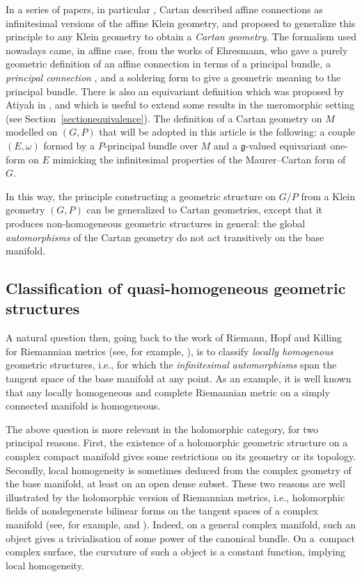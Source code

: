 \documentclass[10pt,a4paper]{amsart}
\numberwithin{equation}{section}
\begin{document}
In a series of papers, in particular \cite{Cartan2}, Cartan described affine connections as infinitesimal versions of the affine Klein geometry, and proposed to generalize this principle to any Klein geometry to obtain a \textit{Cartan geometry}. The formalism used nowadays came, in affine case, from the works of Ehresmann, who gave a purely geometric definition of an affine connection in terms of a principal bundle, a \textit{principal connection} \cite[p.~154]{Erhesmanh}, and a soldering form to give a geometric meaning to the principal bundle. There is also an equivariant definition which was proposed by Atiyah in \cite[p.~188]{Atiyah}, and which is useful to extend some results in the meromorphic setting (see Section~\ref{sectionequivalence}). The definition of a Cartan geometry on $M$ modelled on $(G,P)$ that will be adopted in this article is the following: a couple $(E,\omega)$ formed by a $P$-principal bundle over $M$ and a $\mathfrak{g}$-valued equivariant one-form on $E$ mimicking the infinitesimal properties of the Maurer--Cartan form of $G$.

 In this way, the principle constructing a geometric structure on $G/P$ from a Klein geometry $(G,P)$ can be generalized to Cartan geometries, except that it produces non-homogeneous geometric structures in general: the global \textit{automorphisms} of the Cartan geometry do not act transitively on the base manifold.

 \subsection{Classification of quasi-homogeneous geometric structures}
 A natural question then, going back to the work of Riemann, Hopf and Killing for Riemannian metrics (see, for example, \cite{Wolf}), is to classify \textit{locally homogenous} geometric structures, i.e., for which the \textit{infinitesimal automorphisms} span the tangent space of the base manifold at any point. As an example, it is well known that any locally homogeneous and complete Riemannian metric on a simply connected manifold is homogeneous.

 The above question is more relevant in the holomorphic category, for two principal reasons. First, the existence of a holomorphic geometric structure on a complex compact manifold gives some restrictions on its geometry or its topology. Secondly, local homogeneity is sometimes deduced from the complex geometry of the base manifold, at least on an open dense subset. These two reasons are well illustrated by the holomorphic version of Riemannian metrics, i.e., holomorphic fields of nondegenerate bilinear forms on the tangent spaces of a complex manifold (see, for example, \cite[definition on p.~1663]{DumitrescuMetriques} and \cite[definition on p.~210]{LeBrun}). Indeed, on a general complex manifold, such an object gives a trivialisation of some power of the canonical bundle. On a~compact complex surface, the curvature of such a object is a constant function, implying local homogeneity.
\end{document}
